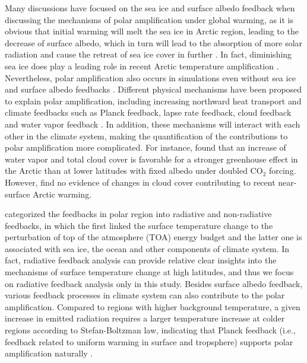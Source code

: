 Many discussions have focused on the sea ice and surface albedo feedback when discussing the mechanisms of polar amplification under global warming, as it is obvious that initial warming will melt the sea ice in Arctic region, leading to the decrease of surface albedo, which in turn will lead to the absorption of more solar radiation and cause the retreat of sea ice cover in further \citep{Serreze2011}. In fact, diminishing sea ice does play a leading role in recent Arctic temperature amplification \citep{Screen2010}. Nevertheless, polar amplification also occurs in simulations even without sea ice and surface albedo feedbacks \citep[e.g.,][]{Alexeev2005,Langen2012,Cai2005,Cai2006}. Different physical mechanisms have been proposed to explain polar amplification, including increasing northward heat transport \citep{Alexeev2005} and climate feedbacks such as Planck feedback, lapse rate feedback, cloud feedback and water vapor feedback \citep{Pithan2014,Screen2010,Vavrus2004}. In addition, these mechanisms will interact with each other in the climate system, making the quantification of the contributions to polar amplification more complicated. For instance, \cite{Graversen2009} found that an increase of water vapor and total cloud cover is favorable for a stronger greenhouse effect in the Arctic than at lower latitudes with fixed albedo under doubled CO$_2$ forcing. However, \cite{Screen2010} find no evidence of changes in cloud cover contributing to recent near-surface Arctic warming.
 
\cite{Goosse2018} categorized the feedbacks in polar region into radiative and non-radiative feedbacks, in which the first linked the surface temperature change to the perturbation of top of the atmosphere (TOA) energy budget and the latter one is associated with sea ice, the ocean and other components of climate system. In fact, radiative feedback analysis can provide relative clear insights into the mechanisms of surface temperature change at high latitudes, and thus we focus on radiative feedback analysis only in this study. Besides surface albedo feedback, various feedback processes in climate system can also contribute to the polar amplification. Compared to regions with higher background temperature, a given increase in emitted radiation requires a larger temperature increase at colder regions according to Stefan-Boltzman law, indicating that Planck feedback (i.e., feedback related to uniform warming in surface and tropsphere) supports polar amplification naturally \citep{Pithan2014}.

